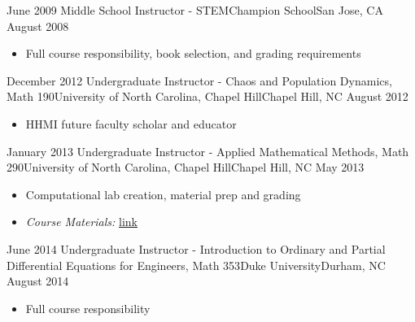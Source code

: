 %
%
%

\begin{experiences}
  \experience
    {June 2009}   {Middle School Instructor - STEM}{Champion School}{San Jose, CA}
    {August 2008} {
                      \begin{itemize}
                        \item Full course responsibility, book selection, and grading requirements
                      \end{itemize}
                    }
                    {}
  \emptySeparator
  \experience
    {December 2012} {Undergraduate Instructor - Chaos and Population Dynamics, Math 190}{University of North Carolina, Chapel Hill}{Chapel Hill, NC}
    {August 2012}{
                      \begin{itemize}
                        \item HHMI future faculty scholar and educator
                      \end{itemize}
                    }
                    {}
  \emptySeparator
  \experience
    {January 2013} {Undergraduate Instructor - Applied Mathematical Methods, Math 290}{University of North Carolina, Chapel Hill}{Chapel Hill, NC}
    {May 2013}{
                      \begin{itemize}
                        \item Computational lab creation, material prep and grading
                        \item {\textit{Course Materials:} \href{https://github.com/ajbaird/computational_math}{link}}
                      \end{itemize}
                    }
                    {}
    \emptySeparator
  \experience
    {June 2014} {Undergraduate Instructor - Introduction to Ordinary and Partial Differential Equations for Engineers, Math 353}{Duke University}{Durham, NC}
    {August 2014}{
                      \begin{itemize}
                        \item Full course responsibility
                      \end{itemize}
                    }
                    {}

\end{experiences}
